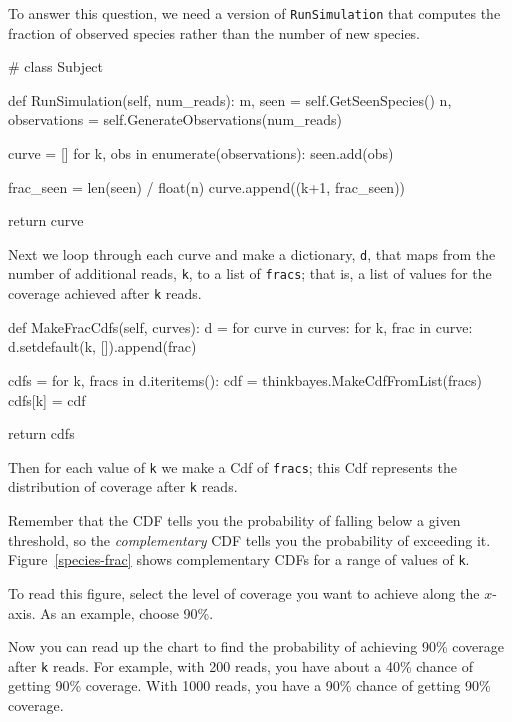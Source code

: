 \documentclass[12pt]{book}
\theoremstyle{exercise}
\begin{document}
To answer this question, we need a version of {\tt RunSimulation}
that computes the fraction of observed species rather than the
number of new species.

\begin{code}
# class Subject

    def RunSimulation(self, num_reads):
        m, seen = self.GetSeenSpecies()
        n, observations = self.GenerateObservations(num_reads)

        curve = []
        for k, obs in enumerate(observations):
            seen.add(obs)

            frac_seen = len(seen) / float(n)
            curve.append((k+1, frac_seen))

        return curve
\end{code}

Next we loop through each curve and make a dictionary, {\tt d},
that maps from the number of additional reads, {\tt k}, to
a list of {\tt fracs}; that is, a list of values for the
coverage achieved after {\tt k} reads.

\begin{code}
    def MakeFracCdfs(self, curves):
        d = {}
        for curve in curves:
            for k, frac in curve:
                d.setdefault(k, []).append(frac)

        cdfs = {}
        for k, fracs in d.iteritems():
            cdf = thinkbayes.MakeCdfFromList(fracs)
            cdfs[k] = cdf

        return cdfs
\end{code}

Then for each value of {\tt k} we make a Cdf of {\tt fracs}; this Cdf
represents the distribution of coverage after {\tt k} reads.

Remember that the CDF tells you the probability of falling below a
given threshold, so the {\em complementary} CDF tells you the
probability of exceeding it.  Figure~\ref{species-frac} shows
complementary CDFs for a range of values of {\tt k}.

To read this figure, select the level of coverage you want to achieve
along the $x$-axis.  As an example, choose 90\%.

Now you can read up the chart to find the probability of achieving
90\% coverage after {\tt k} reads.  For example, with 200 reads,
you have about a 40\% chance of getting 90\% coverage.  With 1000 reads, you
have a 90\% chance of getting 90\% coverage.
\end{document}
